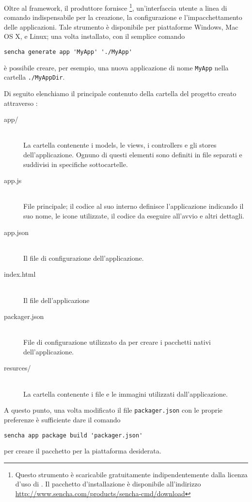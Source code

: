             Oltre al frame\-work, il produttore fornisce \senchacmd{}\footnote{
            Questo strumento è scaricabile gratuitamente indipendentemente dalla
            licenza d'uso di \senchat{}. Il pacchetto d'installazione è
            disponibile all'indirizzo \url{http://www.sencha.com/products/sencha-cmd/download}},
            un'interfaccia utente a linea di comando indispensabile per la
            creazione, la configurazione e l'impacchettamento delle applicazioni.
            Tale strumento è disponibile per piattaforme Windows, Mac OS X, e Linux;
            una volta installato, con il semplice comando
            \begin{lstlisting}[language=MyBash]
  sencha generate app 'MyApp' './MyApp'
            \end{lstlisting}
            è possibile creare, per esempio, una nuova applicazione di nome
            \verb|MyApp| nella cartella \verb|./MyAppDir|.

            Di seguito elenchiamo il principale contenuto della cartella del
            progetto creato attraverso \senchacmd{}:
            \begin{description}
                \item[app/]\hfill \\
                    La cartella contenente i models, le views, i controllers e
                    gli stores dell'applicazione. Ognuno di questi elementi sono
                    definiti in file \js{} separati e suddivisi in specifiche
                    sottocartelle.
                \item[app.js]\hfill \\
                    File \js{} principale; il codice al suo interno definisce
                    l'applicazione indicando il suo nome, le icone utilizzate,
                    il codice da eseguire all'avvio e altri dettagli.
                \item[app.json]\hfill \\
                    Il file di configurazione dell'applicazione.
                \item[index.html]\hfill \\
                    Il file \html{} dell'applicazione
                \item[packager.json]\hfill \\
                    File di configurazione utilizzato da \senchacmd{} per creare
                    i pacchetti nativi dell'applicazione.
                \item[resurces/]\hfill \\
                    La cartella contenente i file \css{} e le immagini utilizzati
                    dall'applicazione.
            \end{description}
            A questo punto, una volta modificato il file \verb|packager.json| con
            le proprie preferenze è sufficiente dare il comando
            \begin{lstlisting}[language=MyBash]
  sencha app package build 'packager.json'
            \end{lstlisting}
            per creare il pacchetto per la piattaforma desiderata.

